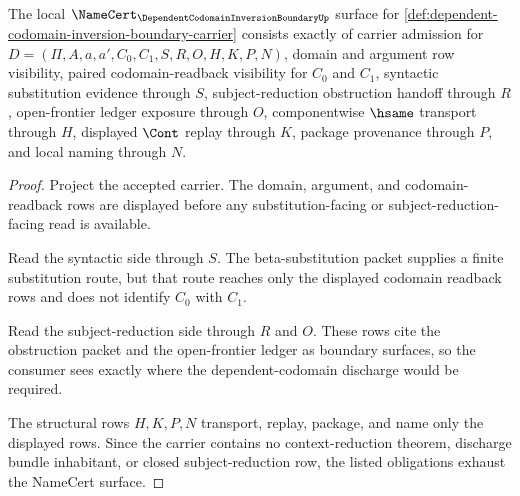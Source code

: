 \begin{theorem}
\label{thm:dependent-codomain-inversion-boundary-namecert-obligations}
The local $\NameCert_{\DependentCodomainInversionBoundaryUp}$ surface for \autoref{def:dependent-codomain-inversion-boundary-carrier} consists exactly of carrier admission for $D=(\Pi,A,a,a',C_0,C_1,S,R,O,H,K,P,N)$, domain and argument row visibility, paired codomain-readback visibility for $C_0$ and $C_1$, syntactic substitution evidence through $S$, subject-reduction obstruction handoff through $R$, open-frontier ledger exposure through $O$, componentwise $\hsame$ transport through $H$, displayed $\Cont$ replay through $K$, package provenance through $P$, and local naming through $N$.
\end{theorem}
\begin{proof}
Project the accepted carrier. The domain, argument, and codomain-readback rows are displayed before any substitution-facing or subject-reduction-facing read is available.

Read the syntactic side through $S$. The beta-substitution packet supplies a finite substitution route, but that route reaches only the displayed codomain readback rows and does not identify $C_0$ with $C_1$.

Read the subject-reduction side through $R$ and $O$. These rows cite the obstruction packet and the open-frontier ledger as boundary surfaces, so the consumer sees exactly where the dependent-codomain discharge would be required.

The structural rows $H,K,P,N$ transport, replay, package, and name only the displayed rows. Since the carrier contains no context-reduction theorem, discharge bundle inhabitant, or closed subject-reduction row, the listed obligations exhaust the NameCert surface.
\end{proof}

